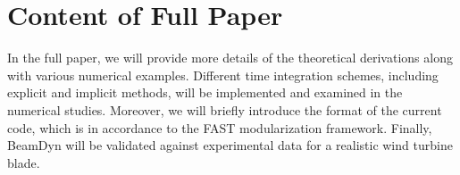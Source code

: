 \documentclass{aiaa-tc}
\begin{document}
 
 \section{Content of Full Paper} In the full paper, we will provide more
details of the theoretical derivations along with various numerical
examples. Different time integration schemes, including explicit and
implicit methods, will be implemented and examined in the numerical studies.
Moreover, we will briefly introduce the format of the current code, which is
in accordance to the FAST modularization framework. Finally,  BeamDyn
will be validated against experimental data for a realistic wind turbine
blade.




\end{document}
